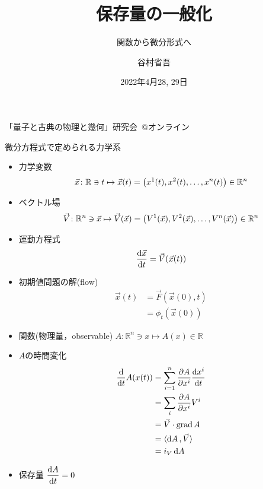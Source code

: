 \documentclass[dvipdfmx]{beamer}
\author{谷村省吾}
\institute[名大情報]{名古屋大学情報学研究科}
\date[April 30, 2022]{2022年4月28, 29日}
\title[\textcolor{white}{保存量の一般化}]{
保存量の一般化}
\subtitle{関数から微分形式へ}
\theoremstyle{break}
\newcommand{\R}{\mathbb{R}}
\begin{document}
\begin{frame}
				「量子と古典の物理と幾何」研究会\ @オンライン
		\maketitle
\end{frame}

\begin{frame}{微分方程式で定められる力学系}
		\begin{itemize}
				\item 力学変数 
						\begin{align}
								\vec{x}\colon \R\ni t \mapsto \vec{x}(t) = \qty(x^1(t),x^2(t),  \ldots, x^n(t)) \in \R^n
						\end{align}
				\item ベクトル場 
						\begin{align}
								\vec{V}\colon \R^n \ni \vec{x}\mapsto \vec{V}(\vec{x}) = \qty(V^1(\vec{x}), V^2(\vec{x}), \ldots, V^n(\vec{x}))\in \R^n 
						\end{align}
				\item 運動方程式 
						\begin{align}
								\dv{\vec{x}}{t} = \vec{V}(\vec{x}(t))
						\end{align}
				\item 初期値問題の解(flow)
						\begin{align}
								\vec{x}(t) &= \vec{F}(\vec{x}(0), t)\\
										   &= \phi_t(\vec{x}(0))
						\end{align}
		\end{itemize}
\end{frame}

\begin{frame}
		\begin{itemize}
				\item 関数(物理量，observable) $A\colon \R^n \ni x \mapsto A(x)\in \R $
				\item $A $の時間変化
						\begin{align}
								\dv{}{t}A(x(t)) &= \sum_{i=1}^n\pdv{A}{x^i}\dv{x^i}{t}\\
												&= \sum_i\pdv{A}{x^i}V^i\\
												&= \vec{V}\cdot \operatorname{grad}A\\
												&= \langle \dd{A}, \vec{V}\rangle\\
												&= i_V\dd{A}
						\end{align}
				\item 保存量 $\displaystyle\dv{A}{t} = 0 $
		\end{itemize}
\end{frame}
\end{document}
